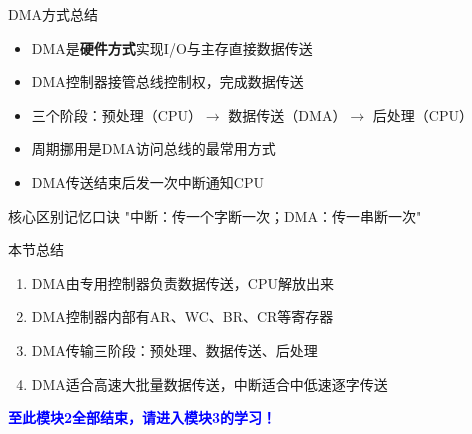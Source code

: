 \documentclass[10pt, aspectratio=169]{beamer}
\begin{document}
\begin{frame}{DMA方式总结}
    \begin{itemize}
        \item DMA是\textbf{硬件方式}实现I/O与主存直接数据传送
        \item DMA控制器接管总线控制权，完成数据传送
        \item 三个阶段：预处理（CPU）$\rightarrow$ 数据传送（DMA）$\rightarrow$ 后处理（CPU）
        \item 周期挪用是DMA访问总线的最常用方式
        \item DMA传送结束后发一次中断通知CPU
    \end{itemize}
    \vspace{0.5em}
    \begin{block}{核心区别记忆口诀}
        "中断：传一个字断一次；DMA：传一串断一次"
    \end{block}
\end{frame}

\begin{frame}{本节总结}
    \begin{enumerate}
        \item DMA由专用控制器负责数据传送，CPU解放出来
        \item DMA控制器内部有AR、WC、BR、CR等寄存器
        \item DMA传输三阶段：预处理、数据传送、后处理
        \item DMA适合高速大批量数据传送，中断适合中低速逐字传送
    \end{enumerate}
    \vspace{1em}
    \begin{center}
        \textcolor{blue}{\textbf{至此模块2全部结束，请进入模块3的学习！}}
    \end{center}
\end{frame}
\end{document}
